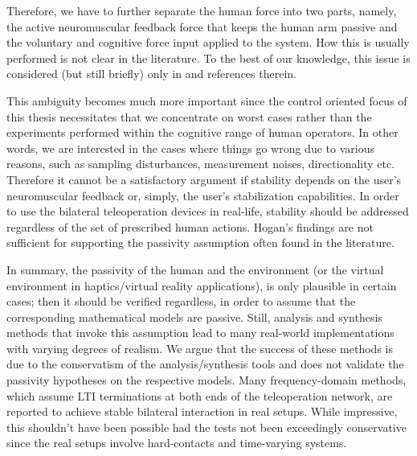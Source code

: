 Therefore, we have to further separate the human force into two parts, namely, the active neuromuscular feedback force that keeps the 
human arm passive and the voluntary and cognitive force input applied to the system. How this is usually performed is not clear in the 
literature. To the best of our knowledge, this issue is considered (but still briefly) only in \cite[Sec. II.B]{kazeroonitsay} and 
references therein.


This ambiguity becomes much more important since the control oriented focus of this thesis necessitates that we concentrate on
worst cases rather than the experiments performed within the cognitive range of human operators. In other words, we are interested in
the cases where things go wrong due to various reasons, such as sampling disturbances, measurement noises, directionality 
etc. Therefore it cannot be a satisfactory argument if stability depends on the user's neuromuscular feedback or, simply, the user's 
stabilization capabilities. In order to use the bilateral teleoperation devices in real-life, stability should be addressed 
regardless of the set of prescribed human actions. Hogan's findings are not sufficient for supporting the passivity assumption 
often found in the literature. 


In summary, the passivity of the human and the environment (or the virtual environment in haptics/virtual reality applications), is 
only plausible in certain cases; then it should be verified regardless, in order to assume that the corresponding mathematical models 
are passive. Still, analysis and synthesis methods that invoke this assumption lead to many real-world implementations 
with varying degrees of realism. We argue that the success of these methods is due to the conservatism of the analysis/synthesis tools
and does not validate the passivity hypotheses on the respective models. Many frequency-domain methods, which assume LTI terminations
at both ends of the teleoperation network, are reported to achieve stable bilateral interaction in real setups. While impressive,
this shouldn't have been possible had the tests not been exceedingly conservative since the real setups involve hard-contacts and 
time-varying systems. 


